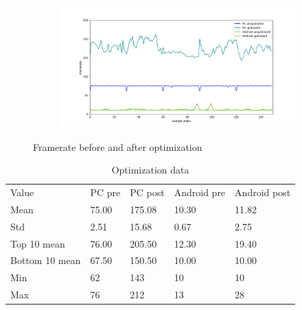 \begin{figure}
\begin{subfigure}{0.49\textwidth}
\includegraphics[width = \textwidth, height = 0.66\textwidth]{images/compromise}
\end{subfigure}
\caption{Framerate before and after optimization}
\end{figure}
\begin{table}
\caption{Optimization data}
\label{tab:conf}
\begin{minipage}{0.49\textwidth}
\begin{center}
\begin{tabular}{lllll}
Value & PC pre & PC post & Android pre & Android post \\
Mean & 75.00 & 175.08 & 10.30 & 11.82 \\
Std & 2.51 & 15.68 & 0.67 & 2.75 \\
Top 10 mean & 76.00 & 205.50 & 12.30 & 19.40 \\
Bottom 10 mean & 67.50 & 150.50 & 10.00 & 10.00 \\
Min & 62 & 143 & 10 & 10 \\
Max & 76 & 212 & 13 & 28 
\end{tabular}
\bigskip
\end{center} 
\end{minipage}
\end{table}